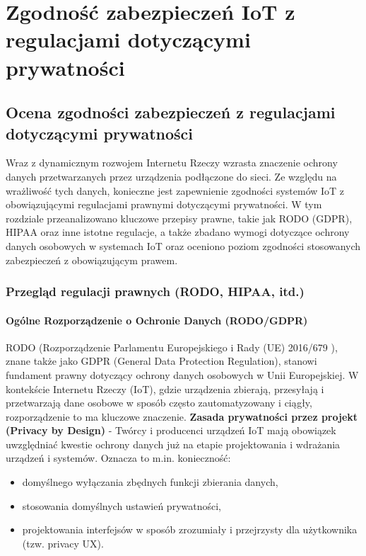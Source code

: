\chapter{Zgodność zabezpieczeń IoT z regulacjami dotyczącymi prywatności}
\label{chap:rozdzial6}
\section{Ocena zgodności zabezpieczeń z regulacjami dotyczącymi prywatności}
Wraz z dynamicznym rozwojem Internetu Rzeczy wzrasta znaczenie ochrony danych przetwarzanych przez urządzenia podłączone do sieci. Ze względu na wrażliwość tych danych, konieczne jest zapewnienie zgodności systemów IoT z obowiązującymi regulacjami prawnymi dotyczącymi prywatności. W tym rozdziale przeanalizowano kluczowe przepisy prawne, takie jak RODO (GDPR), HIPAA oraz inne istotne regulacje, a także zbadano wymogi dotyczące ochrony danych osobowych w systemach IoT oraz oceniono poziom zgodności stosowanych zabezpieczeń z obowiązującym prawem.

\subsection{Przegląd regulacji prawnych (RODO, HIPAA, itd.)}

\subsubsection{Ogólne Rozporządzenie o Ochronie Danych (RODO/GDPR)}
RODO (Rozporządzenie Parlamentu Europejskiego i Rady (UE) 2016/679 \cite{gdpr2016}), znane także jako GDPR (General Data Protection Regulation), stanowi fundament prawny dotyczący ochrony danych osobowych w Unii Europejskiej. W kontekście Internetu Rzeczy (IoT), gdzie urządzenia zbierają, przesyłają i przetwarzają dane osobowe w sposób często zautomatyzowany i ciągły, rozporządzenie to ma kluczowe znaczenie.
\textbf{Zasada prywatności przez projekt (Privacy by Design)} - Twórcy i producenci urządzeń IoT mają obowiązek uwzględniać kwestie ochrony danych już na etapie projektowania i wdrażania urządzeń i systemów. Oznacza to m.in. konieczność:
\begin{itemize}
    \item domyślnego wyłączania zbędnych funkcji zbierania danych,
    
    \item stosowania domyślnych ustawień prywatności,
    
    \item projektowania interfejsów w sposób zrozumiały i przejrzysty dla użytkownika (tzw. privacy UX).
\end{itemize}

